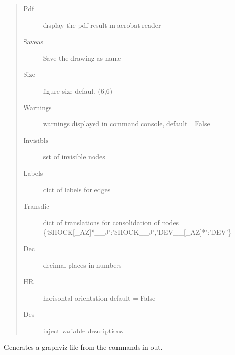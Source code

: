 \documentclass[letterpaper,10pt,english]{sphinxmanual}
\begin{document}
\begin{fulllineitems}
\begin{fulllineitems}
\begin{quote}
\begin{description}
\item[{Pdf}] \leavevmode
\sphinxAtStartPar
display the pdf result in acrobat reader

\item[{Saveas}] \leavevmode
\sphinxAtStartPar
Save the drawing as name

\item[{Size}] \leavevmode
\sphinxAtStartPar
figure size default (6,6)

\item[{Warnings}] \leavevmode
\sphinxAtStartPar
warnings displayed in command console, default =False

\item[{Invisible}] \leavevmode
\sphinxAtStartPar
set of invisible nodes

\item[{Labels}] \leavevmode
\sphinxAtStartPar
dict of labels for edges

\item[{Transdic}] \leavevmode
\sphinxAtStartPar
dict of translations for consolidation of nodes \{‘SHOCK{[}\_A\sphinxhyphen{}Z{]}*\_\_J’:’SHOCK\_\_J’,’DEV\_\_{[}\_A\sphinxhyphen{}Z{]}*’:’DEV’\}

\item[{Dec}] \leavevmode
\sphinxAtStartPar
decimal places in numbers

\item[{HR}] \leavevmode
\sphinxAtStartPar
horisontal orientation default = False

\item[{Des}] \leavevmode
\sphinxAtStartPar
inject variable descriptions

\end{description}\end{quote}

\end{fulllineitems}


\begin{fulllineitems}
\label{\detokenize{index:modelclass.Graph_Draw_Mixin.display_graph}}
\pysigstartsignatures
{}
\pysigstopsignatures
\sphinxAtStartPar
Generates a graphviz file from the commands in out.


\end{fulllineitems}
\end{fulllineitems}
\end{document}
